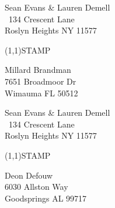 \documentclass[12pt]{article}
\begin{document}
\clearpage

\begin{minipage}{.5\linewidth} \noindent
Sean Evans \& Lauren Demell\\\ 
134 Crescent Lane\\ 
Roslyn Heights NY 11577
\end{minipage}
\begin{minipage}{.5\linewidth \hspace{-.2in} \vspace{-.3in}}
\begin{flushright}
\framebox(1,1){STAMP}
\end{flushright}
\end{minipage}

\begin{center} \begin{Huge} \vspace*{\fill}
Millard Brandman\\
7651 Broadmoor Dr\\
Wimauma FL 50512\\
\vspace{\fill} \end{Huge} \end{center}

\clearpage

\begin{minipage}{.5\linewidth} \noindent
Sean Evans \& Lauren Demell\\\ 
134 Crescent Lane\\ 
Roslyn Heights NY 11577
\end{minipage}
\begin{minipage}{.5\linewidth \hspace{-.2in} \vspace{-.3in}}
\begin{flushright}
\framebox(1,1){STAMP}
\end{flushright}
\end{minipage}

\begin{center} \begin{Huge} \vspace*{\fill}
Deon Defouw\\
6030 Allston Way\\
Goodsprings AL 99717\\
\vspace{\fill} \end{Huge} \end{center}
\end{document}
